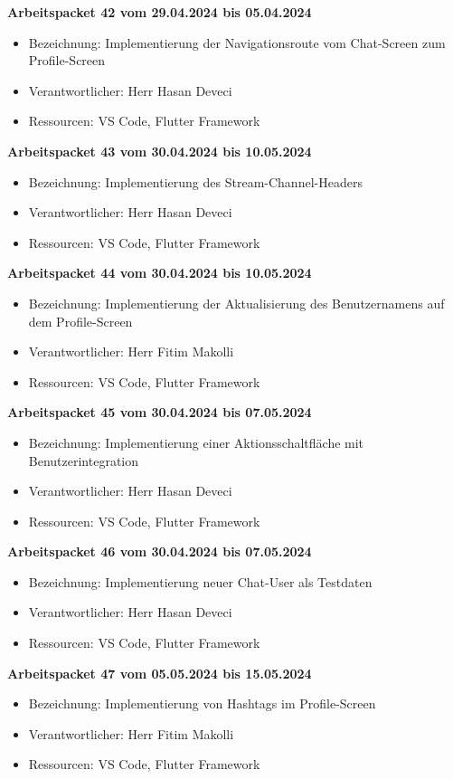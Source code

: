 \textbf{Arbeitspacket 42 vom 29.04.2024 bis 05.04.2024}
\begin{itemize}[itemsep=0pt]
	\item{Bezeichnung: Implementierung der Navigationsroute vom Chat-Screen zum Profile-Screen}
	\item{Verantwortlicher: Herr Hasan Deveci} 
	\item{Ressourcen: VS Code, Flutter Framework} 
\end{itemize} 

\textbf{Arbeitspacket 43 vom 30.04.2024 bis 10.05.2024}
\begin{itemize}[itemsep=0pt]
	\item{Bezeichnung: Implementierung des Stream-Channel-Headers}
	\item{Verantwortlicher: Herr Hasan Deveci} 
	\item{Ressourcen: VS Code, Flutter Framework} 
\end{itemize} 

\textbf{Arbeitspacket 44 vom 30.04.2024 bis 10.05.2024}
\begin{itemize}[itemsep=0pt]
	\item{Bezeichnung: Implementierung der Aktualisierung des Benutzernamens auf dem Profile-Screen}
	\item{Verantwortlicher: Herr Fitim Makolli} 
	\item{Ressourcen: VS Code, Flutter Framework} 
\end{itemize} 

\textbf{Arbeitspacket 45 vom 30.04.2024 bis 07.05.2024}
\begin{itemize}[itemsep=0pt]
	\item{Bezeichnung: Implementierung einer Aktionsschaltfläche mit Benutzerintegration}
	\item{Verantwortlicher: Herr Hasan Deveci} 
	\item{Ressourcen: VS Code, Flutter Framework} 
\end{itemize} 

\textbf{Arbeitspacket 46 vom 30.04.2024 bis 07.05.2024}
\begin{itemize}[itemsep=0pt]
	\item{Bezeichnung: Implementierung neuer Chat-User als Testdaten}
	\item{Verantwortlicher: Herr Hasan Deveci} 
	\item{Ressourcen: VS Code, Flutter Framework} 
\end{itemize} 

\textbf{Arbeitspacket 47 vom 05.05.2024 bis 15.05.2024}
\begin{itemize}[itemsep=0pt]
	\item{Bezeichnung: Implementierung von Hashtags im Profile-Screen}
	\item{Verantwortlicher: Herr Fitim Makolli} 
	\item{Ressourcen: VS Code, Flutter Framework} 
\end{itemize} 

